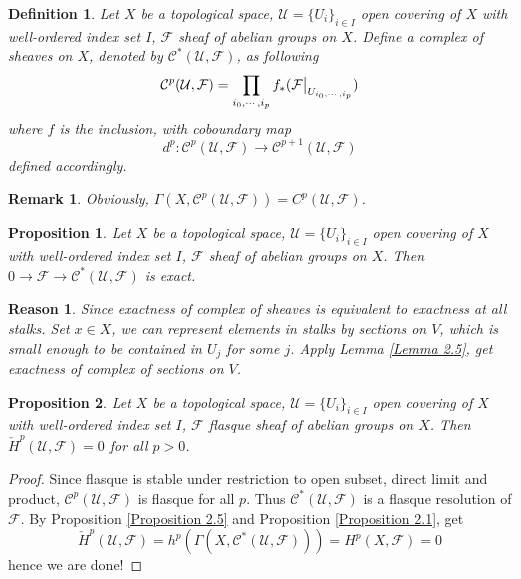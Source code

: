 \documentclass{ctexart}
\newtheorem{definition}{Definition}[section]
\newtheorem{remark}{Remark}[section]
\newtheorem{proposition}{Proposition}[section]
\newtheorem{reason}{Reason}[section]
\begin{document}
\begin{definition}
    Let $X$ be a topological space, $\mathcal{U} = \{U_{i}\}_{i\in I}$ open covering of $X$ with well-ordered index set $I$, $\mathcal{F}$ sheaf of abelian groups on $X$.
    Define a complex of sheaves on $X$, denoted by $\mathcal{C}^{\ast}(\mathcal{U}, \mathcal{F})$, as following
    \begin{equation}
        \mathcal{C}^{p}(\mathcal{U}, \mathcal{F}) = \prod_{i_{0}, \cdots, i_{p}} f_{\ast}(\mathcal{F}\big{|}_{U_{i_{0}, \cdots, i_{p}}})
    \end{equation}
    where $f$ is the inclusion, with coboundary map
    \begin{equation}
        d^{p}: \mathcal{C}^{p}(\mathcal{U}, \mathcal{F}) \longrightarrow \mathcal{C}^{p + 1}(\mathcal{U}, \mathcal{F})
    \end{equation}
    defined accordingly.
\end{definition}
\begin{remark}
    Obviously, $\Gamma(X, \mathcal{C}^{p}(\mathcal{U}, \mathcal{F})) = C^{p}(\mathcal{U}, \mathcal{F})$.
\end{remark}
\begin{proposition}
    Let $X$ be a topological space, $\mathcal{U} = \{U_{i}\}_{i\in I}$ open covering of $X$ with well-ordered index set $I$, $\mathcal{F}$ sheaf of abelian groups on $X$.
    Then $0 \longrightarrow \mathcal{F} \longrightarrow \mathcal{C}^{\ast}(\mathcal{U}, \mathcal{F})$ is exact.
    \vspace{-\baselineskip} %
    \label{Proposition 2.7}
\end{proposition}
\begin{reason}
    Since exactness of complex of sheaves is equivalent to exactness at all stalks.
    Set $x\in X$, we can represent elements in stalks by sections on $V$, which is small enough to be contained in $U_{j}$ for some $j$.
    Apply Lemma \ref{Lemma 2.5}, get exactness of complex of sections on $V$.
\end{reason}
\begin{proposition}
    Let $X$ be a topological space, $\mathcal{U} = \{U_{i}\}_{i\in I}$ open covering of $X$ with well-ordered index set $I$, $\mathcal{F}$ flasque sheaf of abelian groups on $X$.
    Then $\check{H}^{p}(\mathcal{U}, \mathcal{F}) = 0$ for all $p > 0$.
    \vspace{-\baselineskip} %
    \label{Proposition 2.8}
\end{proposition}
\begin{proof}
    Since flasque is stable under restriction to open subset, direct limit and product, $\mathcal{C}^{p}(\mathcal{U}, \mathcal{F})$ is flasque for all $p$.
    Thus $\mathcal{C}^{\ast}(\mathcal{U}, \mathcal{F})$ is a flasque resolution of $\mathcal{F}$.
    By Proposition \ref{Proposition 2.5} and Proposition \ref{Proposition 2.1}, get
    \begin{equation}
        \check{H}^{p}(\mathcal{U}, \mathcal{F}) = h^{p}(\Gamma(X, \mathcal{C}^{\ast}(\mathcal{U}, \mathcal{F}))) = H^{p}(X, \mathcal{F}) = 0
    \end{equation}
    hence we are done!
\end{proof}
\end{document}
